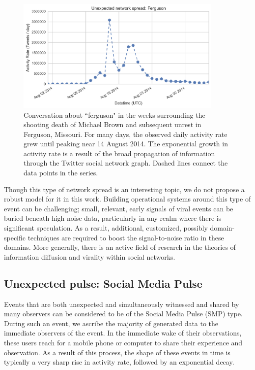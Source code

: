 \documentclass{article}
\begin{document}
\begin{figure}[!b]
\centering
\includegraphics[width=0.9\textwidth]{img/ferguson.png}
\caption{Conversation about ``ferguson" in the weeks surrounding the shooting death of Michael Brown and subsequent unrest in Ferguson, Missouri. For many days, the observed daily activity rate grew until peaking near 14 August 2014. The exponential growth in activity rate is a result of the broad propagation of information through the Twitter social network graph. Dashed lines connect the data points in the series.}
\label{fig:ferguson}
\end{figure}

Though this type of network spread is an interesting topic, we do not propose a robust model for it in this work. Building operational systems around this type of event can be challenging; small, relevant, early signals of viral events can be buried beneath high-noise data, particularly in any realm where there is significant speculation. As a result, additional, customized, possibly domain-specific techniques are required to boost the signal-to-noise ratio in these domains. More generally, there is an active field of research in the theories of information diffusion and virality within social networks.\cite{Gruhl2004,Weng2013,BosaghZadeh2013,Ferrara2015} 


\subsection{Unexpected pulse: Social Media Pulse}
\label{sec:models_unex-pulse}


Events that are both unexpected and simultaneously witnessed and shared by many observers can be considered to be of the Social Media Pulse (SMP) type. During such an event, we ascribe the majority of generated data to the immediate observers of the event. In the immediate wake of their observations, these users reach for a mobile phone or computer to share their experience and observation. As a result of this process, the shape of these events in time is typically a very sharp rise in activity rate, followed by an exponential decay. 
\end{document}
